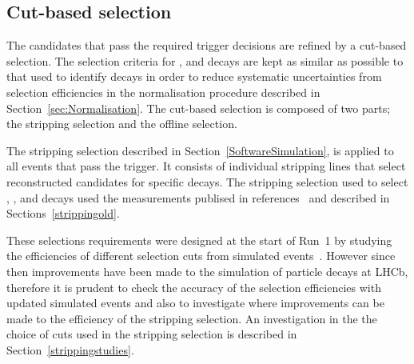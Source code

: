 
\subsection{Cut-based selection}
\label{sec:cutbasedsel}
The \bmumu candidates that pass the required trigger decisions are refined by a cut-based selection. %
The selection criteria for \bhh, \bujpsik and \bsjpsiphi decays are kept as similar as possible to that used to identify \bmumu decays in order to reduce systematic uncertainties from selection efficiencies in the normalisation procedure described in Section~\ref{sec:Normalisation}. 
The cut-based selection is composed of two parts; the stripping selection and the offline selection. 

The stripping selection described in Section~\ref{SoftwareSimulation}, is applied to all events that pass the trigger. It consists of individual stripping lines that select reconstructed candidates for specific decays. The stripping selection used to select \bmumu, \bhh, \bujpsik and \bsjpsiphi decays used the \BF measurements publised in references~\cite{Aaij:2013aka,CMS:2014xfa} and described in Sections~\ref{strippingold}.

These selections requirements were designed at the start of Run~1 by studying the efficiencies of different selection cuts from simulated events~\cite{Diego}. However since then improvements have been made to the simulation of particle decays at LHCb, therefore it is prudent to check the accuracy of the selection efficiencies with updated simulated events and also to investigate where improvements can be made to the efficiency of the \bmumu stripping selection.%
An investigation in the the choice of cuts used in the stripping selection is described in Section~\ref{strippingstudies}. 

